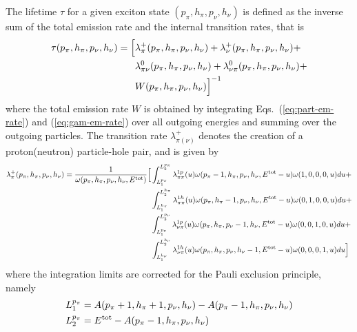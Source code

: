 \documentclass[
10pt,
showpacs,preprintnumbers,footinbib,
amsfonts,amsmath,amssymb,
aps,
prc,twocolumn,groupedaddress,superscriptaddress,
showkeys,
nofootinbib
]{revtex4-1}
\begin{document}
\begin{widetext}
The lifetime $\tau$ for a given exciton state $(p_\pi, h_\pi, p_\nu, h_\nu)$ is defined as the inverse sum of the total emission rate and the internal transition rates, that is
\begin{align}
\tau(p_\pi, h_\pi, p_\nu, h_\nu) = \Big [ & \lambda_\pi^+(p_\pi, h_\pi, p_\nu, h_\nu)  + 
                                                                \lambda_\nu^+(p_\pi, h_\pi, p_\nu, h_\nu) + \notag\\
                                                             &   \lambda_{\pi\nu}^0(p_\pi, h_\pi, p_\nu, h_\nu) + 
                                                              \lambda_{\nu\pi}^0(p_\pi, h_\pi, p_\nu, h_\nu) + \notag\\
                                                             & W(p_\pi, h_\pi, p_\nu, h_\nu) \Big ]^{-1}
\end{align}
where the total emission rate $W$ is obtained by integrating Eqs.~(\ref{eq:part-em-rate}) and  (\ref{eq:gam-em-rate}) over all outgoing energies and summing over the outgoing particles. The transition rate $\lambda_{\pi(\nu)}^+$ denotes the creation of a proton(neutron) particle-hole pair, and is given
by
\begin{align}
\lambda_\pi^+(p_\pi, h_\pi, p_\nu, h_\nu) = \frac{1}{\omega(p_\pi, h_\pi, p_\nu, h_\nu,E^{\rm tot})} 
         \Big [ & \int_{L_1^{p_\pi}}^{L_2^{p_\pi}}\lambda_{\pi\pi}^{1p}(u)\omega(p_\pi-1, h_\pi, p_\nu, h_\nu,E^{\rm tot}-u)\omega(1,0,0,0,u)du + \notag\\
                  & \int_{L_1^{h_\pi}}^{L_2^{h_\pi}}\lambda_{\pi\pi}^{1h}(u)\omega(p_\pi, h_\pi-1, p_\nu, h_\nu,E^{\rm tot}-u)\omega(0,1,0,0,u)du + \notag\\
                  & \int_{L_1^{p_\nu}}^{L_2^{p_\nu}}\lambda_{\nu\pi}^{1p}(u)\omega(p_\pi, h_\pi, p_\nu-1, h_\nu,E^{\rm tot}-u)\omega(0,0,1,0,u)du + \notag\\
                  & \int_{L_1^{h_\nu}}^{L_2^{h_\nu}}\lambda_{\nu\pi}^{1h}(u)\omega(p_\pi, h_\pi, p_\nu, h_\nu-1,E^{\rm tot}-u)\omega(0,0,0,1,u)du 
         \Big ]
\label{eq:lamplus}
\end{align}
where the integration limits are corrected for the Pauli exclusion principle, namely
\begin{align}
L_1^{p_\pi} & = A(p_\pi+1, h_\pi+1, p_\nu, h_\nu) - A(p_\pi-1, h_\pi, p_\nu, h_\nu) \notag \\
L_2^{p_\pi} & = E^{\rm tot}  - A(p_\pi-1, h_\pi, p_\nu, h_\nu) \notag\\

\end{align}
\end{widetext}
\end{document}
